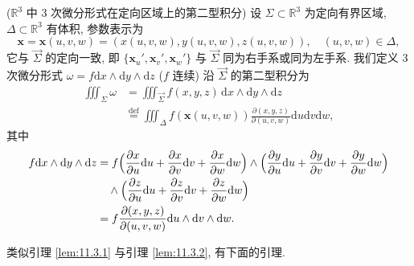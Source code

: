 \begin{definition}\label{def:11.3.5}
($\mathbb{R}^{3}$ 中 3 次微分形式在定向区域上的第二型积分) 设 $\Sigma\subset\mathbb{R}^{3}$ 为定向有界区域, $\Delta\subset\mathbb{R}^{3}$ 有体积, 参数表示为
\[
\boldsymbol{x}=\boldsymbol{x}(u,v,w)=(x(u,v,w),y(u,v,w),z(u,v,w)),\quad(u,v,w)\in\Delta,
\]
它与 $\vec{\Sigma}$ 的定向一致, 即 $\{\boldsymbol{x}_{u}',\boldsymbol{x}_{v}',\boldsymbol{x}_{w}'\}$ 与 $\vec{\Sigma}$ 同为右手系或同为左手系. 我们定义 3 次微分形式 $\omega=f\mathrm{d}x\wedge\mathrm{d}y\wedge\mathrm{d}z$ ($f$ 连续) 沿 $\vec{\Sigma}$ 的第二型积分为
\[
\begin{aligned}
\iiint_{\Sigma}\omega&=\iiint_{\vec{\Sigma}}f(x,y,z)\,\mathrm{d}x\wedge\mathrm{d}y\wedge\mathrm{d}z\\
&\overset{\text{def}}{=}\iiint_{\Delta}f(\boldsymbol{x}(u,v,w))\frac{\partial(x,y,z)}{\partial(u,v,w)}\mathrm{d}u\mathrm{d}v\mathrm{d}w,
\end{aligned}
\]
其中
\[
\begin{aligned}
f\mathrm{d}x\wedge\mathrm{d}y\wedge\mathrm{d}z&=f\Bigl(\frac{\partial x}{\partial u}\mathrm{d}u+\frac{\partial x}{\partial v}\mathrm{d}v+\frac{\partial x}{\partial w}\mathrm{d}w\Bigr)\wedge\Bigl(\frac{\partial y}{\partial u}\mathrm{d}u+\frac{\partial y}{\partial v}\mathrm{d}v+\frac{\partial y}{\partial w}\mathrm{d}w\Bigr)\\
&\quad\wedge\Bigl(\frac{\partial z}{\partial u}\mathrm{d}u+\frac{\partial z}{\partial v}\mathrm{d}v+\frac{\partial z}{\partial w}\mathrm{d}w\Bigr)\\
&=f\frac{\partial(x,y,z)}{\partial(u,v,w)}\mathrm{d}u\wedge\mathrm{d}v\wedge\mathrm{d}w.
\end{aligned}
\]
\end{definition}

类似引理 \ref{lem:11.3.1} 与引理 \ref{lem:11.3.2}, 有下面的引理.

